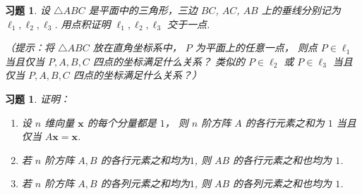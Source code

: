 \documentclass[UTF8]{ctexart}
\newcommand{\bx}{{\bm x}}
\newtheorem{ex}[thm]{习题}
\begin{document}
\begin{ex}
设 $\triangle ABC$ 是平面中的三角形，三边 $BC$, $AC$, $AB$ 上的垂线分别记为 $\ell_1, \ell_2, \ell_3$.
用点积证明 $\ell_1, \ell_2, \ell_3$ 交于一点.

（提示：将 $\triangle ABC$ 放在直角坐标系中，
$P$ 为平面上的任意一点，
则点 $P \in \ell_1$ 当且仅当 $P, A, B, C$ 四点的坐标满足什么关系？
类似的 $P \in \ell_2$ 或 $P \in \ell_3$
当且仅当 $P, A, B, C$ 四点的坐标满足什么关系？）
\end{ex}




\begin{ex}
证明：
\begin{enumerate}
	\item 设 $n$ 维向量 $\bx$ 的每个分量都是 $1$， 则 $n$ 阶方阵  $A$ 的各行元素之和为 $1$ 当且仅当 $A \bx=\bx$.
	\item 若 $n$ 阶方阵 $A, B$ 的各行元素之和均为$1$, 则 $AB$ 的各行元素之和也均为 $1$.
	\item 若 $n$ 阶方阵 $A, B$ 的各列元素之和均为$1$, 则 $AB$ 的各列元素之和也均为 $1$.
\end{enumerate}
\end{ex}
\end{document}
